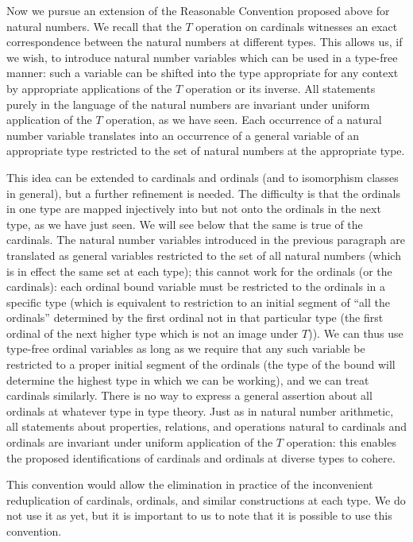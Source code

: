 \documentclass[12pt]{book}
\begin{document}
Now we pursue an extension of the Reasonable Convention proposed above
for natural numbers.  We recall that the $T$ operation on cardinals
witnesses an exact correspondence between the natural numbers at
different types.  This allows us, if we wish, to introduce natural
number variables which can be used in a type-free manner: such a
variable can be shifted into the type appropriate for any context by
appropriate applications of the $T$ operation or its inverse.  All
statements purely in the language of the natural numbers are invariant
under uniform application of the $T$ operation, as we have seen.  Each
occurrence of a natural number variable translates into an occurrence
of a general variable of an appropriate type restricted to the set of
natural numbers at the appropriate type.

This idea can be extended to cardinals and ordinals (and to
isomorphism classes in general), but a further refinement is needed.
The difficulty is that the ordinals in one type are mapped injectively
into but not onto the ordinals in the next type, as we have just seen.
We will see below that the same is true of the cardinals.  The natural
number variables introduced in the previous paragraph are translated
as general variables restricted to the set of all natural numbers
(which is in effect the same set at each type); this cannot work for
the ordinals (or the cardinals): each ordinal bound variable must be
restricted to the ordinals in a specific type (which is equivalent to
restriction to an initial segment of ``all the ordinals'' determined
by the first ordinal not in that particular type (the first ordinal of
the next higher type which is not an image under $T$)).  We can thus
use type-free ordinal variables as long as we require that any such
variable be restricted to a proper initial segment of the ordinals
(the type of the bound will determine the highest type in which we can
be working), and we can treat cardinals similarly.  There is no way to
express a general assertion about all ordinals at whatever type in
type theory.  Just as in natural number arithmetic, all statements
about properties, relations, and operations natural to cardinals and
ordinals are invariant under uniform application of the $T$ operation:
this enables the proposed identifications of cardinals and ordinals at
diverse types to cohere.

This convention would allow the elimination in practice of the
inconvenient reduplication of cardinals, ordinals, and similar
constructions at each type.  We do not use it as yet, but it is
important to us to note that it is possible to use this convention.
\end{document}
